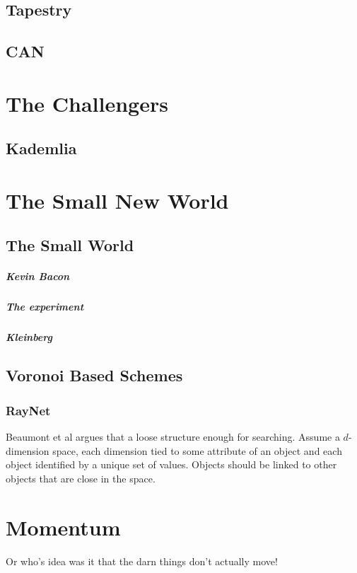 \documentclass[10pt,letterpaper]{report}
\begin{document}
\section{Tapestry}

\section{CAN}




\chapter{The Challengers}

\section{Kademlia}


\chapter{The Small New World}

\section{The Small World}

\paragraph{Kevin Bacon}
\paragraph{The experiment}
\paragraph{Kleinberg}


\section{Voronoi Based Schemes}

\subsection{RayNet}

Beaumont et al argues that a loose structure enough for searching.  Assume a $d$-dimension space, each dimension tied to some attribute of an object and each object identified by a unique set of values.  Objects should be linked to other objects that are close in the space.

\chapter{Momentum}
Or who's idea was it that the darn things don't actually move!
\end{document}
